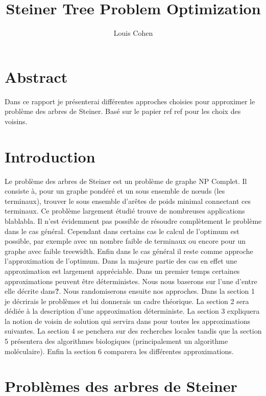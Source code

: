 \documentclass[10pt,a4paper]{article}
\author{Louis Cohen}
\title{Steiner Tree Problem Optimization}
\begin{document}
\maketitle	

\tableofcontents

\section{Abstract}

Dans ce rapport je présenterai différentes approches choisies pour approximer le problème des arbres de Steiner. Basé sur le papier ref ref pour les choix des voisins. 

\section{Introduction}

Le problème des arbres de Steiner est un problème de graphe NP Complet. Il consiste à, pour un graphe pondéré et un sous ensemble de nœuds (les terminaux), trouver le sous ensemble d’arêtes de poids minimal connectant ces terminaux. Ce problème largement étudié trouve de nombreuses applications blablabla. Il n'est évidemment pas possible de résoudre complètement le problème dans le cas général. Cependant dans certains cas le calcul de l'optimum est possible, par exemple avec un nombre faible de terminaux ou encore pour un graphe avec faible treewidth. Enfin dans le cas général il reste comme approche l'approximation de l'optimum. Dans la majeure partie des cas en effet une approximation est largement appréciable. Dans un premier temps certaines approximations peuvent être déterministes.  Nous nous baserons sur l'une d'entre elle décrite dans\textbf{?}. Nous randomiserons ensuite nos approches. Dans la section 1 je décrirais le problèmes et lui donnerais un cadre théorique. La section 2 sera dédiée à la description d'une approximation déterministe. La section 3 expliquera la notion de voisin de solution qui servira dans pour toutes les approximations suivantes. La section 4 se penchera sur des recherches locales tandis que la section 5 présentera des algorithmes biologiques (principalement un algorithme moléculaire). Enfin la section 6 comparera les différentes approximations.


\section{Problèmes des arbres de Steiner}
\end{document}
